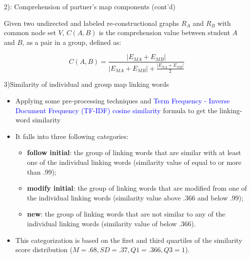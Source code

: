 \begin{frame}{2): Comprehension of partner's map components (cont'd)}

Given two undirected and labeled re-constructional graphs $R_A$ and $R_B$ with common node set $V$, 
$C(A, B)$ is the comprehension value between student $A$ and $B$, as a pair in a group, defined as: 

\begin{equation}
  C(A, B) = \frac{|E_{MA} + E_{MB}|}{|E_{MA} + E_{MB}| + \frac{|E_{NA} + E_{NB}|}{2}} 
  \label{eq:6}
\end{equation}

\end{frame}

\begin{frame}{3)Similarity of individual and group map linking words}

\begin{itemize}
    \item Applying some pre-processing techniques and \textcolor{blue}{Term Frequency - Inverse Document Frequency (TF-IDF) cosine similarity} formula to get the linking-word similarity
    \item It falls into three following categories: 
    {\small \begin{itemize}
        \item \textbf{follow initial}: the group of linking words that are similar with at least one of the individual linking words (similarity value of equal to or more than .99);
        \item \textbf{modify initial}: the group of linking words that are modified from one of the individual linking words (similarity value above .366 and below .99);
        \item \textbf{new}: the group of linking words that are not similar to any of the individual linking words (similarity value of below .366).
    \end{itemize}} 
    \item This categorization is based on the first and third quartiles 
    of the similarity score distribution ($M = .68, SD = .37, Q1 = .366, Q3 = 1$).
\end{itemize}

\end{frame}

